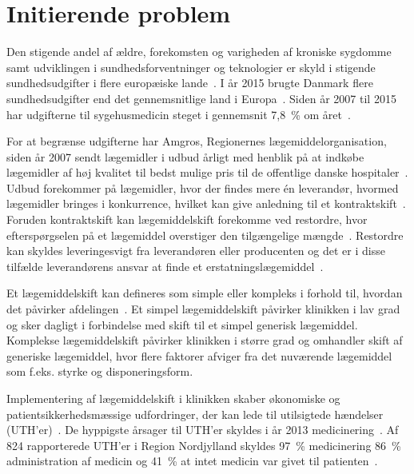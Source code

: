 \chapter{Initierende problem}
Den stigende andel af ældre, forekomsten og varigheden af kroniske sygdomme samt udviklingen i sundhedsforventninger og teknologier er skyld i stigende sundhedsudgifter i flere europæiske lande~\citep{Ess2003}. I år 2015 brugte Danmark flere sundhedsudgifter end det gennemsnitlige land i Europa~\citep{EU2017}. Siden år 2007 til 2015 har udgifterne til sygehusmedicin steget i gennemsnit  7,8~\% om året~\citep{Sundhed2016}.

For at begrænse udgifterne har Amgros, Regionernes lægemiddelorganisation, siden år 2007 sendt lægemidler i udbud årligt med henblik på at indkøbe lægemidler af høj kvalitet til bedst mulige pris til de offentlige danske hospitaler~\citep{Sygehusapoteket2017}. Udbud forekommer på lægemidler, hvor der findes mere én leverandør, hvormed lægemidler bringes i konkurrence, hvilket kan give anledning til et kontraktskift~\citep{Amgros2015}. Foruden kontraktskift kan lægemiddelskift forekomme ved restordre, hvor efterspørgselen på et lægemiddel overstiger den tilgængelige mængde~\citep{Amgros2015}. Restordre kan skyldes leveringesvigt fra leverandøren eller producenten og det er i disse tilfælde leverandørens ansvar at finde et erstatningslægemiddel~\citep{Laegemiddelinformaion2017, Amgros2017}. 

Et lægemiddelskift kan defineres som simple eller kompleks i forhold til, hvordan det påvirker afdelingen~\citep{Laegemiddelinformaion2017, Sygehusapoteket2017a}. Et simpel lægemiddelskift påvirker klinikken i lav grad og sker dagligt i forbindelse med skift til et simpel generisk lægemiddel.%
Komplekse lægemiddelskift påvirker klinikken i større grad og omhandler skift af  generiske lægemiddel, hvor flere faktorer afviger fra det nuværende lægemiddel som f.eks. styrke og disponeringsform.~\citep{Laegemiddelinformaion2017, Sygehusapoteket2017a}

Implementering af lægemiddelskift i klinikken skaber økonomiske og patientsikkerhedsmæssige udfordringer, der kan lede til utilsigtede hændelser (UTH'er)~\citep{Laegemiddelinformaion2017, Sygehusapoteket2017a}. De hyppigste årsager til UTH'er skyldes i år 2013 medicinering~\citep{Patientombuddet2013}. Af 824 rapporterede UTH'er i Region Nordjylland skyldes 97~\% medicinering 86~\% administration af medicin og 41~\% at intet medicin var givet til patienten~\citep{Jensen2014}.

